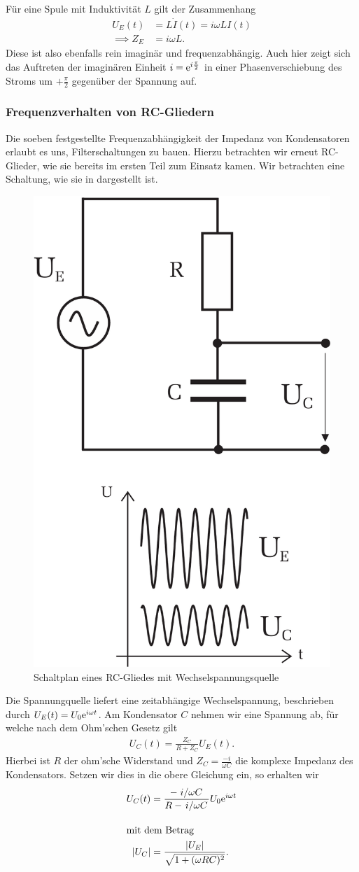 Für eine Spule mit Induktivität $L$ gilt der Zusammenhang
\begin{align}
  U_E(t) &= L \dot{I}(t) = i\omega LI(t)\\[1em]
  \implies Z_E &= i \omega L.
\end{align}
Diese ist also ebenfalls rein imaginär und frequenzabhängig. Auch hier zeigt sich das Auftreten der imaginären Einheit $i = \text{e}^{i\frac{\pi}{2}}$ in einer Phasenverschiebung des Stroms um $+\frac{\pi}{2}$ gegenüber der Spannung auf.

\subsubsection*{Frequenzverhalten von RC-Gliedern}

Die soeben festgestellte Frequenzabhängigkeit der Impedanz von Kondensatoren erlaubt es uns, Filterschaltungen zu bauen. Hierzu betrachten wir erneut RC-Glieder, wie sie bereits im ersten Teil zum Einsatz kamen. Wir betrachten eine Schaltung, wie sie in  dargestellt ist.

\begin{figure}[H]
  \centering
  \includegraphics[width=.3\textwidth]{files/script/schaltpl_rc_ac.png}
  \caption{Schaltplan eines RC-Gliedes mit Wechselspannungsquelle}
  \label{fig:schaltpl_rc_ac}
\end{figure}

Die Spannungquelle liefert eine zeitabhängige Wechselspannung, beschrieben durch $U_E(t) = U_0 \text{e}^{i\omega t}$. Am Kondensator $C$ nehmen wir eine Spannung ab, für welche nach dem Ohm'schen Gesetz gilt
\begin{align}
  U_C(t) = \frac{Z_C}{R + Z_C} U_E(t).
\end{align}
Hierbei ist $R$ der ohm'sche Widerstand und $Z_C = \frac{-i}{\omega C}$ die komplexe Impedanz des Kondensators. Setzen wir dies in die obere Gleichung ein, so erhalten wir
\begin{align}
  U_C(t) &= \frac{-\ffrac{i}{\omega C}}{R - \ffrac{i}{\omega C}} U_0 \e{i \omega t}\\[1em]
  \intertext{mit dem Betrag}
  \qty|U_C| &= \frac{\qty|U_E|}{\sqrt{1 + (\omega R C)^2}}. \label{eq:ampl_tp}
\end{align}

